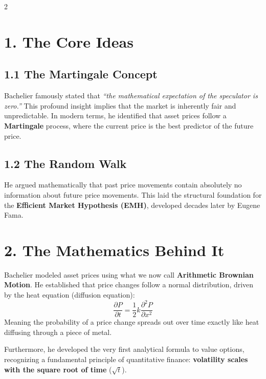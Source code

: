 \documentclass[a4paper,10.5pt]{article}
\begin{document}
\begin{multicols}{2}
\small

\section*{1. The Core Ideas}

\subsection*{1.1 The Martingale Concept}
Bachelier famously stated that \textit{``the mathematical expectation of the speculator is zero.''} This profound insight implies that the market is inherently fair and unpredictable. In modern terms, he identified that asset prices follow a \textbf{Martingale} process, where the current price is the best predictor of the future price.

\subsection*{1.2 The Random Walk}
He argued mathematically that past price movements contain absolutely no information about future price movements. This laid the structural foundation for the \textbf{Efficient Market Hypothesis (EMH)}, developed decades later by Eugene Fama.

\section*{2. The Mathematics Behind It}
Bachelier modeled asset prices using what we now call \textbf{Arithmetic Brownian Motion}. He established that price changes follow a normal distribution, driven by the heat equation (diffusion equation):
$$
\frac{\partial P}{\partial t} = \frac{1}{2} k \frac{\partial^2 P}{\partial x^2}
$$
Meaning the probability of a price change spreads out over time exactly like heat diffusing through a piece of metal. 

\vspace{5pt}
Furthermore, he developed the very first analytical formula to value options, recognizing a fundamental principle of quantitative finance: \textbf{volatility scales with the square root of time} ($\sqrt{t}$).


\end{multicols}
\end{document}
